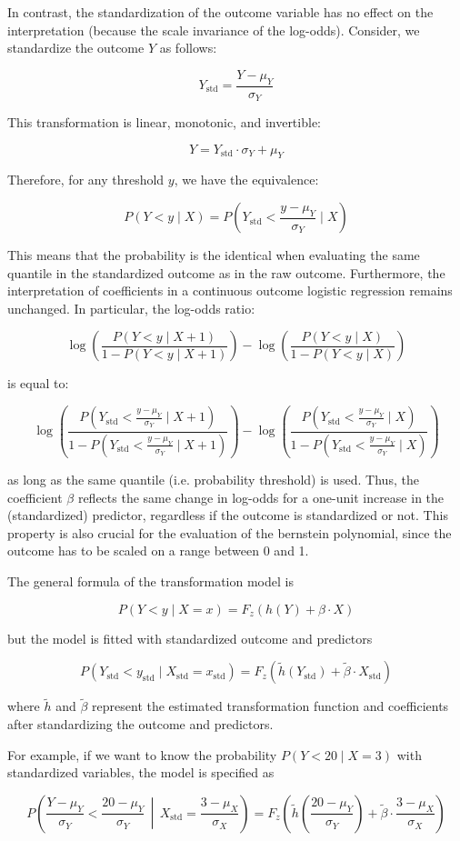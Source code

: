 In contrast, the standardization of the outcome variable has no effect on the interpretation (because the scale invariance of the log-odds). Consider, we standardize the outcome \( Y \) as follows:

\[
Y_{\text{std}} = \frac{Y - \mu_Y}{\sigma_Y}
\]

This transformation is linear, monotonic, and invertible:

\[
Y = Y_{\text{std}} \cdot \sigma_Y + \mu_Y
\]

Therefore, for any threshold \( y \), we have the equivalence:

\[
P(Y < y \mid X) = P\left(Y_{\text{std}} < \frac{y - \mu_Y}{\sigma_Y} \mid X\right)
\]

This means that the probability is the identical when evaluating the same quantile in the standardized outcome as in the raw outcome. Furthermore, the interpretation of coefficients in a continuous outcome logistic regression remains unchanged. In particular, the log-odds ratio:

\[
\log \left( \frac{P(Y < y \mid X + 1)}{1 - P(Y < y \mid X + 1)} \right) -
\log \left( \frac{P(Y < y \mid X)}{1 - P(Y < y \mid X)} \right)
\]

is equal to:

\[
\log \left( \frac{P\left(Y_{\text{std}} < \frac{y - \mu_Y}{\sigma_Y} \mid X + 1\right)}{1 - P\left(Y_{\text{std}} < \frac{y - \mu_Y}{\sigma_Y} \mid X + 1\right)} \right) -
\log \left( \frac{P\left(Y_{\text{std}} < \frac{y - \mu_Y}{\sigma_Y} \mid X\right)}{1 - P\left(Y_{\text{std}} < \frac{y - \mu_Y}{\sigma_Y} \mid X\right)} \right)
\]

as long as the same quantile (i.e. probability threshold) is used. Thus, the coefficient \( \beta \) reflects the same change in log-odds for a one-unit increase in the (standardized) predictor, regardless if the outcome is standardized or not. This property is also crucial for the evaluation of the bernstein polynomial, since the outcome has to be scaled on a range between 0 and 1.


The general formula of the transformation model is

\[
P(Y < y \mid X = x) = F_z\left(h(Y) + \beta \cdot X\right)
\]

but the model is fitted with standardized outcome and predictors

\[
P(Y_{\text{std}} < y_{\text{std}} \mid X_{\text{std}} = x_{\text{std}}) = F_z\left(\tilde{h}(Y_{\text{std}}) + \tilde{\beta} \cdot X_{\text{std}}\right)
\]

where $\tilde{h}$ and $\tilde{\beta}$ represent the estimated transformation function and coefficients after standardizing the outcome and predictors.

For example, if we want to know the probability \( P(Y < 20 \mid X = 3) \) with standardized variables, the model is specified as

\[
P\left(\frac{Y - \mu_Y}{\sigma_Y} < \frac{20 - \mu_Y}{\sigma_Y} \,\middle|\, X_{\text{std}} = \frac{3 - \mu_X}{\sigma_X} \right)
= F_z\left(\tilde{h}\left(\frac{20 - \mu_Y}{\sigma_Y}\right) + \tilde{\beta} \cdot \frac{3 - \mu_X}{\sigma_X} \right)
\]

